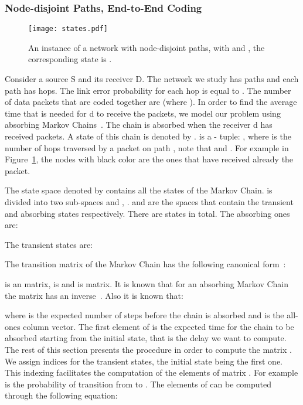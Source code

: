 \documentclass[journal, onecolumn, 12pt]{IEEEtran}
\begin{document}
\subsubsection{Node-disjoint Paths, End-to-End Coding}
\label{sec:analysis_node_disjoint_paths}

\begin{figure}
\begin{center}
\texttt{[image: states.pdf]}
\caption{An instance of a network with node-disjoint paths, with  and , the corresponding state is .}
\label{fig:state}
\end{center}
\end{figure}

Consider a source S and its receiver D.
The network we study has  paths and each path has  hops.
The link error probability for each hop is equal to .
The number of data packets that are coded together are  (where ).
In order to find the average time that is needed for d to receive the packets, we model our problem using absorbing Markov Chains~\cite{b:prob}.
The chain is absorbed when the receiver d has received  packets.
A state of this chain is denoted by .
 is a - tuple: , where  is the number of hops traversed by a packet on path , note that  and .
For example in Figure~\ref{fig:state}, the nodes with black color are the ones that have received already the packet.

The state space denoted by  contains all the  states of the Markov Chain.  is divided into two sub-spaces  and , .  and  are the spaces that contain the transient and absorbing states respectively. There are  states in total.
The absorbing ones are:

The transient states are:


The transition matrix  of the Markov Chain has the following canonical form~\cite{b:prob}:



 is an  matrix,  is  and  is  matrix. It is known that for an absorbing Markov Chain the matrix  has an inverse~\cite{b:prob}. Also it is known that:


where  is the expected number of steps before the chain is absorbed and  is the all-ones column vector. The first element of  is the expected time for the chain to be absorbed starting from the initial state, that is the delay we want to compute.
The rest of this section presents the procedure in order to compute the matrix .
We assign indices for the transient states, the initial state  being the first one.
This indexing facilitates the computation of the elements of matrix . For example  is the probability of transition from  to .
The elements of  can be computed through the following equation:
\end{document}
